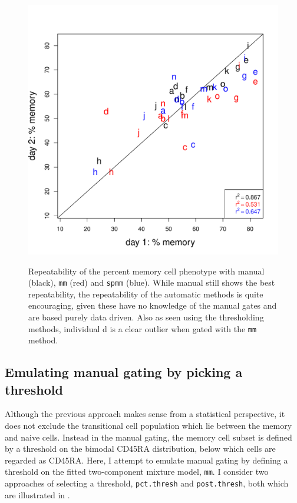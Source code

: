 \begin{figure}
{}
\begin{minipage}{.5\textwidth}
\includegraphics[width=\linewidth]{figures/repeatability-memory-weights.pdf}
\end{minipage}
{Repeatability of the percent memory cell phenotype with manual (black), \texttt{mm} (red) and \texttt{spmm} (blue).}
{
  While manual still shows the best repeatability, the repeatability of the automatic methods is quite encouraging, given
  these have no knowledge of the manual gates and are based purely data driven.
  Also as seen using the thresholding methods, individual d is a clear outlier when gated with the \texttt{mm} method.
}
\end{figure}


\subsection{Emulating manual gating by picking a threshold}

Although the previous approach makes sense from a statistical perspective, it does not exclude the transitional cell population which lie
between the memory and naive cells.
Instead in the manual gating, the memory cell subset is defined by a threshold on the bimodal CD45RA distribution, below which cells are regarded as CD45RA\negative.
Here, I attempt to emulate manual gating by defining a threshold on the fitted two-component mixture model, \texttt{mm}.
I consider two approaches of selecting a threshold, \texttt{pct.thresh} and \texttt{post.thresh}, both which are illustrated in .

